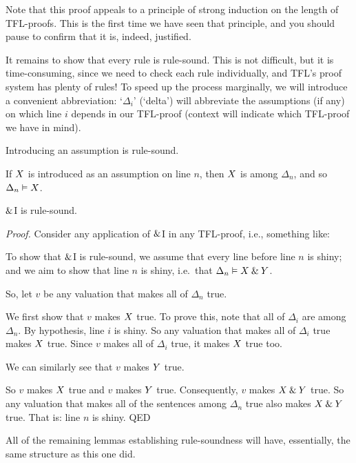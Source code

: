 Note that this proof appeals to a principle of strong induction on the length of TFL-proofs. This is the first time we have seen that principle, and you should pause to confirm that it is, indeed, justified.

It remains to show that every rule is rule-sound. This is not difficult, but it is time-consuming, since we need to check each rule individually, and TFL's proof system has plenty of rules! To speed up the process marginally, we will introduce a convenient abbreviation: `$\Delta_i$' (`delta') will abbreviate the assumptions (if any) on which line $i$ depends in our TFL-proof (context will indicate which TFL-proof we have in mind).

\begin{highlighted}Introducing an assumption is rule-sound.
\end{highlighted}

If $X$ is introduced as an assumption on line $n$, then $X$ is among $\Delta_n$, and so $\Delta_n \vDash X$.

\begin{highlighted}$\mathbin{\&}$I is rule-sound.
\end{highlighted}

\emph{Proof.} Consider any application of $\mathbin{\&}$I in any TFL-proof, i.e., something like:
\begin{pf}
	 
\end{pf}\noindent
To show that $\mathbin{\&}$I is rule-sound, we assume that every line before line $n$ is shiny; and we aim to show that line $n$ is shiny, i.e.\ that $\Delta_n \vDash X \mathbin{\&} Y$.

So, let $v$ be any valuation that makes all of $\Delta_{n}$ true.

We first show that $v$ makes $X$ true. To prove this, note that all of $\Delta_i$ are among $\Delta_{n}$. By hypothesis, line $i$ is shiny. So any valuation that makes all of $\Delta_i$ true makes $X$ true. Since $v$ makes all of $\Delta_i$ true, it makes $X$ true too.

We can similarly see that $v$ makes $Y$ true.

So $v$ makes $X$ true and $v$ makes $Y$ true. Consequently, $v$ makes $X\mathbin{\&}Y$ true. So any valuation that makes all of the sentences among $\Delta_{n}$ true also makes $X \mathbin{\&} Y$ true. That is: line $n$ is shiny. QED


All of the remaining lemmas establishing rule-soundness will have, essentially, the same structure as this one did.

